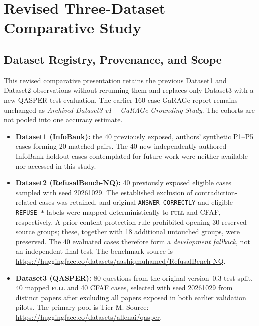 


\section{Revised Three-Dataset Comparative Study}

\label{cfaf:sec:external-validation}

\label{cfaf:sec:three-dataset}

\subsection{Dataset Registry, Provenance, and Scope}

This revised comparative presentation retains the previous Dataset1 and Dataset2 observations without rerunning them and replaces only Dataset3 with a new QASPER test evaluation. The earlier 160-case GaRAGe report remains unchanged as \emph{Archived Dataset3-v1 -- GaRAGe Grounding Study}. The cohorts are not pooled into one accuracy estimate.

\begin{itemize}

    \item \textbf{Dataset1 (InfoBank):} the 40 previously exposed, authors' synthetic P1--P5 cases forming 20 matched pairs. The 40 new independently authored InfoBank holdout cases contemplated for future work were neither available nor accessed in this study.

    \item \textbf{Dataset2 (RefusalBench-NQ):} 40 previously exposed eligible cases sampled with seed 20261029. The established exclusion of contradiction-related cases was retained, and original \texttt{ANSWER\_CORRECTLY} and eligible \texttt{REFUSE\_*} labels were mapped deterministically to \textsc{full} and CFAF, respectively. A prior content-protection rule prohibited opening 30 reserved source groups; these, together with 18 additional untouched groups, were preserved. The 40 evaluated cases therefore form a \emph{development fallback}, not an independent final test. The benchmark source is \url{https://huggingface.co/datasets/aashiqmuhamed/RefusalBench-NQ}.

\item \textbf{Dataset3 (QASPER):} 80 questions from the original version~0.3 test split, 40 mapped \textsc{full} and 40 CFAF cases, selected with seed 20261029 from distinct papers after excluding all papers exposed in both earlier validation pilots. The primary pool is Tier M. Source: \url{https://huggingface.co/datasets/allenai/qasper}.

\end{itemize}

